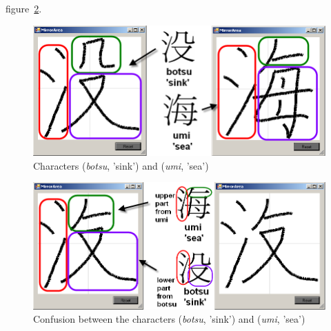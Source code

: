 figure~\ref{fig:eval:hybrid935and117}.
\begin{figure}[htbp]
  \begin{center}
    \includegraphics[scale=0.75]{images/char935vsChar117HandwrittenMarked.png}
    \caption{Characters  (\emph{botsu}, 'sink') and  (\emph{umi}, 'sea')}
    \label{fig:eval:botsuumiprintvsdrawn}
  \end{center}
\end{figure}
\begin{figure}[htbp]
  \begin{center}
    \includegraphics[scale=0.57]{images/char935and117HybridMarked.png}
    \caption{Confusion between the characters  (\emph{botsu}, 'sink') and  (\emph{umi}, 'sea')}
    \label{fig:eval:hybrid935and117}
  \end{center}
\end{figure}

